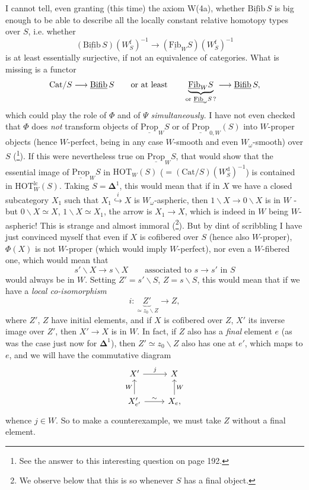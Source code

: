 \documentclass[11pt]{article}
\newcommand{\printedpage}[1]{\marginpar{\footnotesize p.~#1}}
\newcommand{\msp}[1]{\marginpar{\footnotesize [#1]}}
\newcommand{\Fib}{\underline{\mathrm{Fib}}}
\newcommand{\Prop}{\underline{\mathrm{Prop}}}
\newcommand{\Bifib}{\underline{\mathrm{Bifib}}}
\newcommand{\HOT}{\mathrm{HOT}}
\begin{document}
I cannot tell, even granting (this time) the axiom W(4a), whether $\Bifib\, S$ is big enough to be able to describe all the locally constant relative homotopy types over $S$, i.e. whether %
\[ (\Bifib\, S)(W^{\mathrm{f}}_S)^{-1} \longrightarrow (\Fib_W S)(W^{\mathrm{f}}_S)^{-1} \]
is at least essentially surjective, if not an equivalence of categories. What is missing is a functor
\[ \mathrm{Cat}/S \longrightarrow \Bifib\, S \qquad \text{or at least} \qquad \underbrace{\Fib_W S}_{\text{or $\Fib_\omega S$\,?}} \longrightarrow \Bifib\, S, \]
\printedpage{116}
which could play the role of $\Phi$ and of $\Psi$ \textit{simultaneous\msp{page 187}ly.} I have not even checked that $\Phi$ does \textit{not} transform objects of $\Prop_W S$ or of $\Prop_{0,W}(S)$ into $W$-proper objects (hence $W$-perfect, being in any case $W$-smooth and even $W_\omega$-smooth) over $S$ (\footnote{See the answer to this interesting question on page 192.}). If this were nevertheless true on $\Prop_W S$, that would show that the essential image of $\Prop_W S$ in $\HOT_W(S)$ ($= (\mathrm{Cat}/S)(W^{\mathrm{d}}_S)^{-1}$) is contained in $\HOT^{\mathrm{lc}}_W(S)$. %
Taking $S = \mathbf{\Delta}^1$, this would mean that if in $X$ we have a closed subcategory $X_1$ such that $X_1 \overset{i}{\hookrightarrow} X$ is $W_\omega$-aspheric, then $1\backslash X \longrightarrow 0\backslash X$ is in $W$ - but $0\backslash X \simeq X$, $1\backslash X \simeq X_1$, the arrow is $X_1 \longrightarrow X$, which is indeed in $W$ being $W$-aspheric! This is strange and almost immoral (\footnote{We observe below that this is so whenever $S$ has a final object.}). But by dint of scribbling I have just convinced myself that even if $X$ is cofibered over $S$ (hence also $W$-proper), $\Phi(X)$ is not $W$-proper (which would imply $W$-perfect), nor
\msp{page 188}
even a $W$-fibered one, which would mean that
\[ s'\backslash X \longrightarrow s\backslash X \qquad \text{associated to } s \longrightarrow s' \text{ in } S \]
would always be in $W$. Setting $Z' = s'\backslash S$, $Z = s\backslash S$, this would mean that if we have a \textit{local co-isomorphism}
\[ i : \underbrace{Z'}_{\simeq z_0\backslash Z} \longrightarrow Z, \]
where $Z'$, $Z$ have initial elements, and if $X$ is cofibered over $Z$, $X'$ its inverse image over $Z'$, then $X' \longrightarrow X$ is in $W$. In fact, if $Z$ also has a \textit{final} element $e$ (as was the case just now for $\mathbf{\Delta}^1$), then $Z' \simeq z_0\backslash Z$ also has one at $e'$, which maps to $e$, and we will have the commutative diagram
\[
\begin{tikzcd}
X' \arrow[r, "j"] & X \\
X'_{e'} \arrow[u, "W"] \arrow[r, "\sim"] & X_e, \arrow[u, "W"']
\end{tikzcd}
\]
whence $j \in W$. So to make a counterexample,
\msp{page 189}
we must take $Z$ without a final element.
\end{document}

